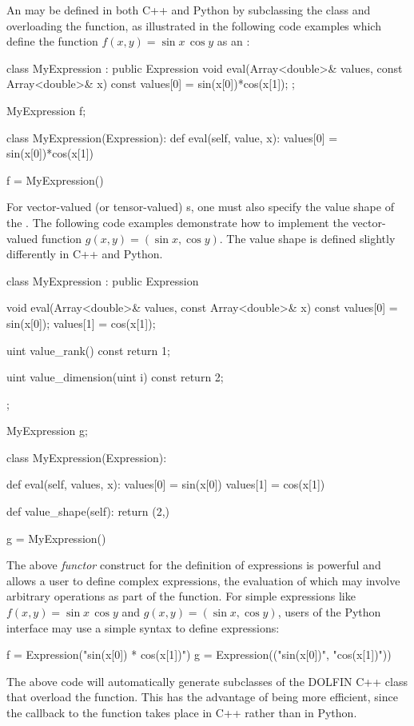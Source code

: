 An  may be defined in both C++ and Python by
subclassing the  class and overloading the 
function, as illustrated in the following code examples which define
the function $f(x, y) = \sin x \, \cos y$ as an :
\begin{c++}
class MyExpression : public Expression
{
  void eval(Array<double>& values, const Array<double>& x) const
  {
    values[0] = sin(x[0])*cos(x[1]);
  }
};

MyExpression f;
\end{c++}
\begin{python}
class MyExpression(Expression):
    def eval(self, value, x):
        values[0] = sin(x[0])*cos(x[1])

f = MyExpression()
\end{python}
For vector-valued (or tensor-valued) s, one must also
specify the value shape of the . The following code
examples demonstrate how to implement the vector-valued function $g(x,
y) = (\sin x, \cos y)$. The value shape is defined slightly
differently in C++ and Python.
\begin{c++}
class MyExpression : public Expression
{
  void eval(Array<double>& values, const Array<double>& x) const
  {
    values[0] = sin(x[0]);
    values[1] = cos(x[1]);
  }

  uint value_rank() const
  {
    return 1;
  }

  uint value_dimension(uint i) const
  {
    return 2;
  }
};

MyExpression g;
\end{c++}
\begin{python}
class MyExpression(Expression):

    def eval(self, values, x):
        values[0] = sin(x[0])
        values[1] = cos(x[1])

    def value_shape(self):
        return (2,)

g = MyExpression()
\end{python}

The above \emph{functor} construct for the definition of expressions is
powerful and allows a user to define complex expressions, the evaluation
of which may involve arbitrary operations as part of the 
function. For simple expressions like $f(x, y) = \sin x \, \cos y$ and
$g(x, y) = (\sin x, \cos y)$, users of the Python interface may use a
simple syntax to define expressions:
\begin{python}
f = Expression("sin(x[0]) * cos(x[1])")
g = Expression(("sin(x[0])", "cos(x[1])"))
\end{python}
The above code will automatically generate subclasses of the DOLFIN C++
 class that overload the  function. This has the
advantage of being more efficient, since the callback to the 
function takes place in C++ rather than in Python.

